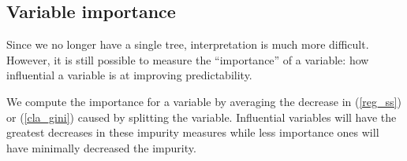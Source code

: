 \subsection{Variable importance}

Since we no longer have a single tree, interpretation is much more difficult. However, it is still possible to measure the ``importance'' of a variable: how influential a variable is at improving predictability.

We compute the importance for a variable by averaging the decrease in (\ref{reg_ss}) or (\ref{cla_gini}) caused by splitting the variable. Influential variables will have the greatest decreases in these impurity measures while less importance ones will have minimally decreased the impurity.
